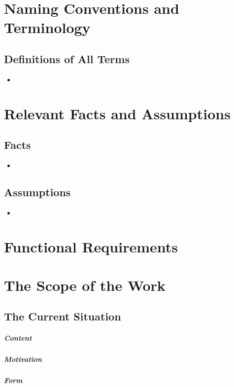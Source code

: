\documentclass{article}
\begin{document}
\section{Naming Conventions and Terminology}
\subsection{Definitions of All Terms}
\begin{itemize}
	
\item

	
\end{itemize}

\section{Relevant Facts and Assumptions}


\subsection{Facts}
\begin{itemize}
	
\item
	
	
\end{itemize}

\subsection{Assumptions}
\begin{itemize}
	
\item
	
\end{itemize}

\section*{Functional Requirements}

\section{The Scope of the Work}
\subsection{The Current Situation}
\subparagraph{Content}
\subparagraph{Motivation}
\subparagraph{Form}
\end{document}
